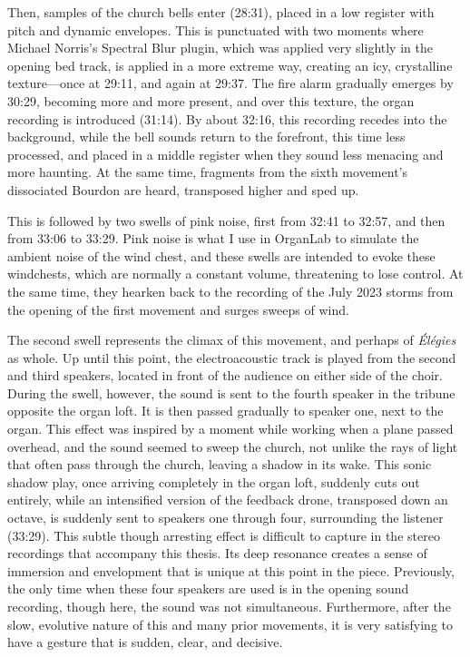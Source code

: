 \documentclass[12pt,twoside,maitrise]{dms_ks}
\theoremstyle{definition}
\begin{document}
{Then, samples of the church bells enter (28:31), placed in a low register with pitch and dynamic envelopes. 
This is punctuated with two moments where Michael Norris's Spectral Blur plugin, which was applied very slightly in the opening bed track, is applied in a more extreme way, creating an icy, crystalline texture---once at 29:11, and again at 29:37. 
The fire alarm gradually emerges by 30:29, becoming more and more present, and over this texture, the organ recording is introduced (31:14). 
By about 32:16, this recording recedes into the background, while the bell sounds return to the forefront, this time less processed, and placed in a middle register when they sound less menacing and more haunting. 
At the same time, fragments from the sixth movement's dissociated Bourdon are heard, transposed higher and sped up.

This is followed by two swells of pink noise, first from 32:41 to 32:57, and then from 33:06 to 33:29.
Pink noise is what I use in OrganLab to simulate the ambient noise of the wind chest, and these swells are intended to evoke these windchests, which are normally a constant volume, threatening to lose control.
At the same time, they hearken back to the recording of the July 2023 storms from the opening of the first movement and surges sweeps of wind.

The second swell represents the climax of this movement, and perhaps of \textit{Élégies} as whole.
Up until this point, the electroacoustic track is played from the second and third speakers, located in front of the audience on either side of the choir.
During the swell, however, the sound is sent to the fourth speaker in the tribune opposite the organ loft.
It is then passed gradually to speaker one, next to the organ.
This effect was inspired by a moment while working when a plane passed overhead, and the sound seemed to sweep the church, not unlike the rays of light that often pass through the church, leaving a shadow in its wake. 
This sonic shadow play, once arriving completely in the organ loft, suddenly cuts out entirely, while an intensified version of the feedback drone, transposed down an octave, is suddenly sent to speakers one through four, surrounding the listener (33:29).
This subtle though arresting effect is difficult to capture in the stereo recordings that accompany this thesis.
Its deep resonance creates a sense of immersion and envelopment that is unique at this point in the piece. 
Previously, the only time when these four speakers are used is in the opening sound recording, though here, the sound was not simultaneous. 
Furthermore, after the slow, evolutive nature of this and many prior movements, it is very satisfying to have a gesture that is sudden, clear, and decisive. 

}
\end{document}
